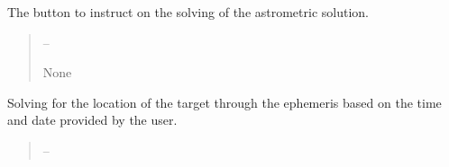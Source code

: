 \documentclass[letterpaper,11pt,english]{sphinxmanual}
\begin{document}
\begin{savenotes}
\begin{fulllineitems}
\begin{savenotes}
\begin{fulllineitems}
\end{fulllineitems}\end{savenotes}


\begin{savenotes}\begin{fulllineitems}
\label{\detokenize{code/opihiexarata.gui.manual:opihiexarata.gui.manual.OpihiManualWindow.__connect_push_button_astrometry_solve_astrometry}}
\pysigstartsignatures
{}
\pysigstopsignatures
\sphinxAtStartPar
The button to instruct on the solving of the astrometric solution.
\begin{quote}\begin{description}
\sphinxAtStartPar
{} – 

\sphinxAtStartPar
None

\end{description}\end{quote}

\end{fulllineitems}\end{savenotes}


\begin{savenotes}\begin{fulllineitems}
\label{\detokenize{code/opihiexarata.gui.manual:opihiexarata.gui.manual.OpihiManualWindow.__connect_push_button_ephemeris_custom_solve}}
\pysigstartsignatures
{}
\pysigstopsignatures
\sphinxAtStartPar
Solving for the location of the target through the ephemeris based
on the time and date provided by the user.
\begin{quote}\begin{description}
\sphinxAtStartPar
{} – 


\end{description}
\end{quote}
\end{fulllineitems}
\end{savenotes}
\end{fulllineitems}
\end{savenotes}
\end{document}
